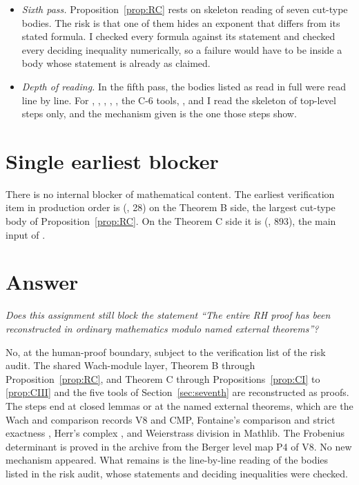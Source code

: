 \documentclass[11pt]{article}
\theoremstyle{definition}
\theoremstyle{remark}
\begin{document}
\begin{itemize}[leftmargin=*,itemsep=1pt]
\item \emph{Sixth pass.} Proposition~\ref{prop:RC} rests on skeleton reading of seven cut-type bodies. The risk is that one of them hides an exponent that differs from its stated formula. I checked every formula against its statement and checked every deciding inequality numerically, so a failure would have to be inside a body whose statement is already as claimed.
\item \emph{Depth of reading.} In the fifth pass, the bodies listed as read in full were read line by line. For , , , , , the C-6 tools, ,  and  I read the skeleton of top-level steps only, and the mechanism given is the one those steps show.
\end{itemize}

\section{Single earliest blocker}

There is no internal blocker of mathematical content. The earliest verification item in production order is  (, 28) on the Theorem B side, the largest cut-type body of Proposition~\ref{prop:RC}. On the Theorem C side it is  (, 893), the main input of .

\section{Answer}

\emph{Does this assignment still block the statement ``The entire RH proof has been reconstructed in ordinary mathematics modulo named external theorems''?}

No, at the human-proof boundary, subject to the verification list of the risk audit. The shared Wach-module layer, Theorem B through Proposition~\ref{prop:RC}, and Theorem C through Propositions~\ref{prop:CI} to \ref{prop:CIII} and the five tools of Section~\ref{sec:seventh} are reconstructed as proofs. The steps end at closed lemmas or at the named external theorems, which are the Wach and comparison records V8 and CMP, Fontaine's comparison  and strict exactness , Herr's complex , and Weierstrass division in Mathlib. The Frobenius determinant  is proved in the archive from the Berger level map P4 of V8. No new mechanism appeared. What remains is the line-by-line reading of the bodies listed in the risk audit, whose statements and deciding inequalities were checked.
\end{document}
